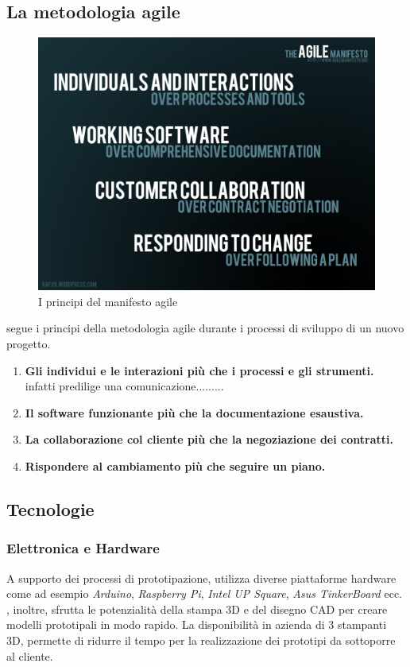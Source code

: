 \subsection{La metodologia agile}
\begin{figure}[H]
	\begin{center}
	\includegraphics[scale=0.25]{immagini/agile_manifesto.jpg}
	\caption{I principi del manifesto agile}
	\end{center}
\end{figure}
\lab{} segue i principi della metodologia agile durante i processi di sviluppo di un nuovo progetto.
\begin{enumerate}
\item \textbf{Gli individui e le interazioni più che i processi e gli strumenti.}
\tab \lab{} infatti predilige una comunicazione.........
\item \textbf{Il software funzionante più che la documentazione esaustiva.}
\item \textbf{La collaborazione col cliente più che la negoziazione dei contratti.}
\item \textbf{Rispondere al cambiamento più che seguire un piano.}
\end{enumerate}




\subsection{Tecnologie}

\subsubsection{Elettronica e Hardware}
A supporto dei processi di prototipazione, \lab{} utilizza diverse piattaforme hardware come ad esempio \textit{Arduino}, \textit{Raspberry Pi}, \textit{Intel UP Square}, \textit{Asus TinkerBoard} ecc.\\
\lab{}, inoltre, sfrutta le potenzialità della stampa 3D e del disegno CAD per creare modelli prototipali in modo rapido. La disponibilità in azienda di 3 stampanti 3D, permette di ridurre il tempo per la realizzazione dei prototipi da sottoporre al cliente.

